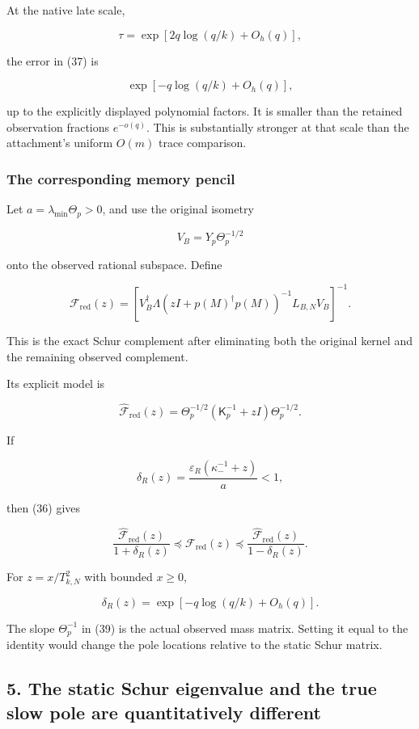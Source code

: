 \documentclass[11pt]{article}
\begin{document}
At the native late scale,

\[
\tau=\exp[2q\log(q/k)+O_h(q)],
\]

the error in (37) is

\[
\exp[-q\log(q/k)+O_h(q)],
\]

up to the explicitly displayed polynomial factors. It is smaller than the retained observation fractions \(e^{-o(q)}\). This is substantially stronger at that scale than the attachment's uniform \(O(m)\) trace comparison.

\subsubsection{The corresponding memory pencil}\label{the-corresponding-memory-pencil}

Let \(a=\lambda_{\min}\Theta_p>0\), and use the original isometry

\[
V_B=Y_p\Theta_p^{-1/2}
\]

onto the observed rational subspace. Define

\[
\mathcal F_{\mathrm{red}}(z)
=
\left[
V_B^\dagger
\Lambda(zI+p(M)^\dagger p(M))^{-1}
L_{B,N}V_B
\right]^{-1}.
\]

This is the exact Schur complement after eliminating both the original kernel and the remaining observed complement.

Its explicit model is

\[
\boxed{
\widehat{\mathcal F}_{\mathrm{red}}(z)
=
\Theta_p^{-1/2}(\mathsf K_p^{-1}+zI)\Theta_p^{-1/2}.
}
\tag{39}
\]

If

\[
\delta_R(z)
=
\frac{\varepsilon_R(\kappa_-^{-1}+z)}a<1,
\]

then (36) gives

\[
\boxed{
\frac{\widehat{\mathcal F}_{\mathrm{red}}(z)}{1+\delta_R(z)}
\preceq
\mathcal F_{\mathrm{red}}(z)
\preceq
\frac{\widehat{\mathcal F}_{\mathrm{red}}(z)}{1-\delta_R(z)}.
}
\tag{40}
\]

For \(z=x/T_{k,N}^2\) with bounded \(x\ge0\),

\[
\delta_R(z)
=
\exp[-q\log(q/k)+O_h(q)].
\]

The slope \(\Theta_p^{-1}\) in (39) is the actual observed mass matrix. Setting it equal to the identity would change the pole locations relative to the static Schur matrix.

\subsection{5. The static Schur eigenvalue and the true slow pole are quantitatively different}\label{the-static-schur-eigenvalue-and-the-true-slow-pole-are-quantitatively-different}
\end{document}
